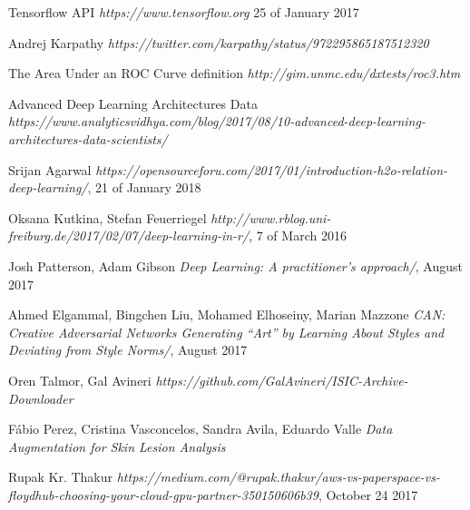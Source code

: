 \documentclass[titlepage,openright,twoside,a4paper,
final,12pt,english]{book}
\begin{document}
\begin{thebibliography}{9}
  Tensorflow API
{\em https://www.tensorflow.org} 25 of January 2017

  Andrej Karpathy 
{\em https://twitter.com/karpathy/status/972295865187512320}

 The Area Under an ROC Curve definition 
{\em http://gim.unmc.edu/dxtests/roc3.htm}

 Advanced Deep Learning Architectures Data
{\em https://www.analyticsvidhya.com/blog/2017/08/10-advanced-deep-learning-architectures-data-scientists/}

 
  Srijan Agarwal
{\em https://opensourceforu.com/2017/01/introduction-h2o-relation-deep-learning/}, 21 of January 2018
 
  Oksana Kutkina, Stefan Feuerriegel
{\em http://www.rblog.uni-freiburg.de/2017/02/07/deep-learning-in-r/}, 7 of March 2016 
 
  Josh Patterson, Adam Gibson
{\em Deep Learning: A practitioner's approach/}, August 2017

 Ahmed Elgammal, Bingchen Liu, Mohamed Elhoseiny, Marian Mazzone {\em CAN: Creative Adversarial Networks Generating “Art” by Learning About Styles and Deviating from Style Norms/}, August 2017

 Oren Talmor, Gal Avineri {\em https://github.com/GalAvineri/ISIC-Archive-Downloader}

 Fábio Perez, Cristina Vasconcelos, Sandra Avila, Eduardo Valle {\em Data Augmentation for Skin Lesion Analysis}


 Rupak Kr. Thakur {\em https://medium.com/@rupak.thakur/aws-vs-paperspace-vs-floydhub-choosing-your-cloud-gpu-partner-350150606b39}, October 24 2017


\end{thebibliography}
\end{document}
